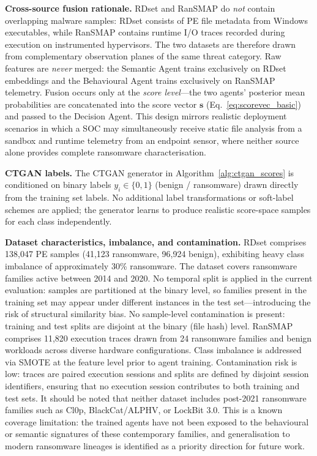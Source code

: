 \documentclass[3p]{elsarticle}
\begin{document}
\noindent\textbf{Cross-source fusion rationale.}
RDset and RanSMAP do \emph{not} contain overlapping malware samples: RDset consists of PE
file metadata from Windows executables, while RanSMAP contains runtime I/O traces recorded
during execution on instrumented hypervisors. The two datasets are therefore drawn from
complementary observation planes of the same threat category. Raw features are
\emph{never} merged: the Semantic Agent trains exclusively on RDset embeddings and the
Behavioural Agent trains exclusively on RanSMAP telemetry. Fusion occurs only at the
\emph{score level}---the two agents' posterior mean probabilities are concatenated into the
score vector $\mathbf{s}$ (Eq.~\ref{eq:scorevec_basic}) and passed to the Decision Agent.
This design mirrors realistic deployment scenarios in which a SOC may simultaneously receive
static file analysis from a sandbox and runtime telemetry from an endpoint sensor, where
neither source alone provides complete ransomware characterisation.

\noindent\textbf{CTGAN labels.}
The CTGAN generator in Algorithm~\ref{alg:ctgan_scores} is conditioned on binary labels
$y_i \in \{0,1\}$ (benign / ransomware) drawn directly from the training set labels. No
additional label transformations or soft-label schemes are applied; the generator learns to
produce realistic score-space samples for each class independently.

\noindent\textbf{Dataset characteristics, imbalance, and contamination.}
RDset comprises 138,047 PE samples (41,123 ransomware, 96,924 benign), exhibiting heavy class imbalance of approximately 30\% ransomware. The dataset covers ransomware families active between 2014 and 2020. No temporal split is applied in the current evaluation: samples are partitioned at the binary level, so families present in the training set may appear under different instances in the test set---introducing the risk of structural similarity bias. No sample-level contamination is present: training and test splits are disjoint at the binary (file hash) level. RanSMAP comprises 11,820 execution traces drawn from 24 ransomware families and benign workloads across diverse hardware configurations. Class imbalance is addressed via SMOTE at the feature level prior to agent training. Contamination risk is low: traces are paired execution sessions and splits are defined by disjoint session identifiers, ensuring that no execution session contributes to both training and test sets. It should be noted that neither dataset includes post-2021 ransomware families such as Cl0p, BlackCat/ALPHV, or LockBit 3.0. This is a known coverage limitation: the trained agents have not been exposed to the behavioural or semantic signatures of these contemporary families, and generalisation to modern ransomware lineages is identified as a priority direction for future work.
\end{document}
